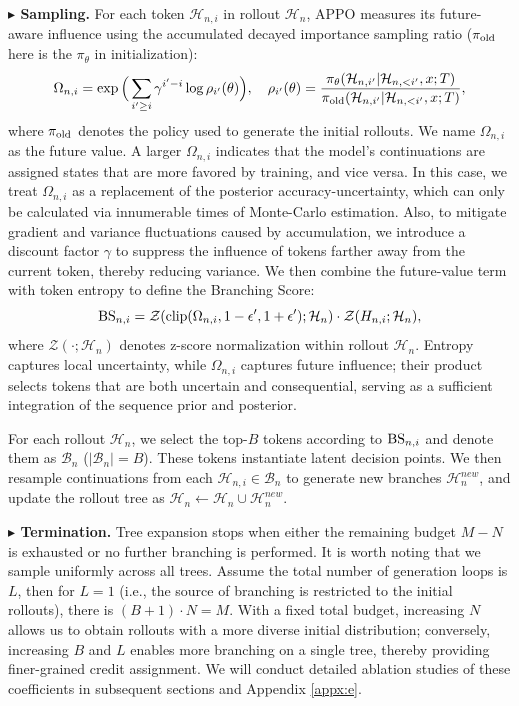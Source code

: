 \documentclass{article}
\begin{document}
\textbf{$\blacktriangleright$ Sampling.}
For each token $\mathcal{H}_{n,i}$ in rollout $\mathcal{H}_n$, APPO measures its future-aware influence using the accumulated decayed importance sampling ratio ($\pi_{\rm old}$ here is the $\pi_{\theta}$ in initialization):
\begin{equation}
    \Omega_{n,i}=\exp\Big(\sum_{i'\ge i}\gamma^{i'-i}\log \rho_{i'}(\theta)\Big), \quad 
    \rho_{i'}(\theta)=\frac{\pi_\theta(\mathcal{H}_{n,i'}|\mathcal{H}_{n,<i'},x;T)}{\pi_{\rm old}(\mathcal{H}_{n,i'}|\mathcal{H}_{n,<i'},x;T)},
\end{equation}
where $\pi_{\rm old}$ denotes the policy used to generate the initial rollouts. We name $\Omega_{n,i}$ as the future value. A larger $\Omega_{n,i}$ indicates that the model’s continuations are assigned states that are more favored by training, and vice versa. In this case, we treat $\Omega_{n,i}$ as a replacement of the posterior accuracy-uncertainty, which can only be calculated via innumerable times of Monte-Carlo estimation. Also, to mitigate gradient and variance fluctuations caused by accumulation, we introduce a discount factor $\gamma$ to suppress the influence of tokens farther away from the current token, thereby reducing variance. We then combine the future-value term with token entropy to define the Branching Score:
\begin{equation}
    {\rm BS}_{n,i}= \mathcal{Z}({\rm clip}(\Omega_{n,i},1-\epsilon',1+\epsilon');\mathcal{H}_{n}) \cdot \mathcal{Z}(H_{n,i};\mathcal{H}_{n}),
\end{equation}
where $\mathcal{Z}(\cdot;\mathcal{H}_n)$ denotes z-score normalization within rollout $\mathcal{H}_n$. Entropy captures local uncertainty, while $\Omega_{n,i}$ captures future influence; their product selects tokens that are both uncertain and consequential, serving as a sufficient integration of the sequence prior and posterior.

For each rollout $\mathcal{H}_n$, we select the top-$B$ tokens according to ${\rm BS}_{n,i}$ and denote them as $\mathcal{B}_n$ ($|\mathcal{B}_n|=B$). These tokens instantiate latent decision points. We then resample continuations from each $\mathcal{H}_{n,i}\in\mathcal{B}_n$ to generate new branches $\mathcal{H}_n^{new}$, and update the rollout tree as $\mathcal{H}_n \leftarrow \mathcal{H}_n \cup \mathcal{H}_n^{new}$.

\textbf{$\blacktriangleright$ Termination.}
Tree expansion stops when either the remaining budget $M-N$ is exhausted or no further branching is performed. It is worth noting that we sample uniformly across all trees. Assume the total number of generation loops is $L$, then for $L=1$ (i.e., the source of branching is restricted to the initial rollouts), there is $(B+1)\cdot N=M$. With a fixed total budget, increasing $N$ allows us to obtain rollouts with a more diverse initial distribution; conversely, increasing $B$ and $L$ enables more branching on a single tree, thereby providing finer-grained credit assignment. We will conduct detailed ablation studies of these coefficients in subsequent sections and Appendix \ref{appx:e}.
\end{document}
